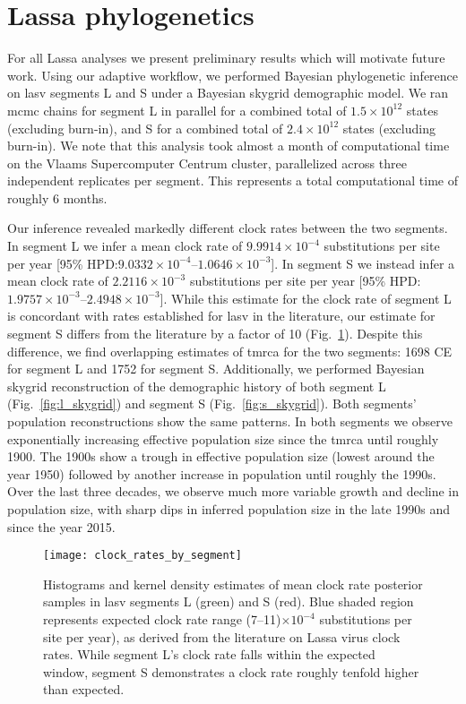 \section{Lassa phylogenetics}

For all Lassa analyses we present preliminary results which will motivate future work.
Using our adaptive workflow, we performed Bayesian phylogenetic inference on \gls{lasv} segments L and S under a Bayesian skygrid demographic model.
We ran \gls{mcmc} chains for segment L in parallel for a combined total of $1.5\times10^{12}$ states (excluding burn-in), and S for a combined total of $2.4\times10^{12}$ states (excluding burn-in).
We note that this analysis took almost a month of computational time on the Vlaams Supercomputer Centrum cluster, parallelized across three independent replicates per segment.
This represents a total computational time of roughly 6 months.

Our inference revealed markedly different clock rates between the two segments.
In segment L we infer a mean clock rate of $9.9914\times10^{-4}$ substitutions per site per year [95\% HPD:$9.0332\times10^{-4}$--$1.0646\times10^{-3}$].
In segment S we instead infer a mean clock rate of $2.2116\times10^{-3}$ substitutions per site per year [95\% HPD:$1.9757\times10^{-3}$--$2.4948\times10^{-3}$].
While this estimate for the clock rate of segment L is concordant with rates established for \gls{lasv} in the literature\cite{andersen2015clinical, fichet2016spatial}, our estimate for segment S differs from the literature by a factor of 10 (Fig.~\ref{fig:lassa_clock_rates}).
Despite this difference, we find overlapping estimates of \gls{tmrca} for the two segments: 1698 CE for segment L and 1752 for segment S.
Additionally, we performed Bayesian skygrid reconstruction of the demographic history of both segment L (Fig.~\ref{fig:l_skygrid}) and segment S (Fig.~\ref{fig:s_skygrid}).
Both segments' population reconstructions show the same patterns.
In both segments we observe exponentially increasing effective population size since the \gls{tmrca} until roughly 1900.
The 1900s show a trough in effective population size (lowest around the year 1950) followed by another increase in population until roughly the 1990s.
Over the last three decades, we observe much more variable growth and decline in population size, with sharp dips in inferred population size in the late 1990s and since the year 2015.

\begin{figure}[ht]
  \centering
  \medskip
  \texttt{[image: clock\_rates\_by\_segment]}
  \caption[LASV clock rates by segment]{Histograms and kernel density estimates of mean clock rate posterior samples in \gls{lasv} segments L (green) and S (red). Blue shaded region represents expected clock rate range (7--11)$\times10^{-4}$ substitutions per site per year), as derived from the literature on Lassa virus clock rates\cite{andersen2015clinical, fichet2016spatial}. While segment L's clock rate falls within the expected window, segment S demonstrates a clock rate roughly tenfold higher than expected.}
  \label{fig:lassa_clock_rates}
\end{figure}

